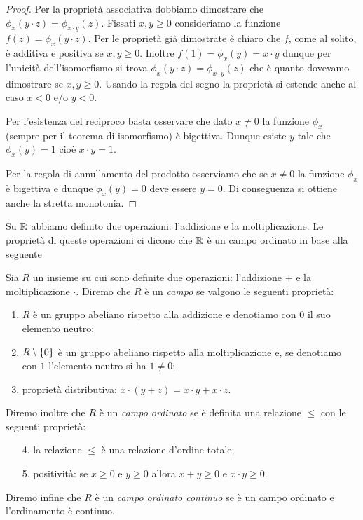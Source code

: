 \begin{proof}
Per la proprietà associativa dobbiamo dimostrare che 
$\phi_x(y\cdot z) = \phi_{x\cdot y}(z)$.
Fissati $x,y\ge 0$ consideriamo 
la funzione $f(z) = \phi_x(y\cdot z)$.
Per le proprietà già dimostrate è chiaro 
che $f$, come al solito, è additiva e positiva
se $x,y\ge 0$.
Inoltre $f(1) = \phi_x(y) = x\cdot y$ 
dunque per l'unicità dell'isomorfismo si 
trova $\phi_x(y\cdot z) = \phi_{x\cdot y}(z)$
che è quanto dovevamo dimostrare se $x,y\ge 0$.
Usando la regola del segno la proprietà si estende 
anche al caso $x<0$ e/o $y<0$.

Per l'esistenza del reciproco basta osservare 
che dato $x\neq 0$ la funzione $\phi_x$ 
(sempre per il teorema di isomorfismo) è 
bigettiva. Dunque esiste $y$ tale che $\phi_x(y)=1$
cioè $x\cdot y = 1$.

Per la regola di annullamento del prodotto osserviamo che 
se $x\neq 0$ la funzione $\phi_x$ è bigettiva 
e dunque $\phi_x(y)=0$ deve essere $y=0$.
Di conseguenza si ottiene anche la stretta monotonia.
\end{proof}

Su ${\mathbb R}$ abbiamo definito due operazioni: l'addizione e la moltiplicazione.
Le proprietà di queste operazioni ci dicono che ${\mathbb R}$ 
è un campo ordinato in base alla seguente

\begin{definition}[campo]
Sia $R$ un insieme su cui sono definite due operazioni: l'addizione $+$ e la moltiplicazione $\cdot$.
Diremo che $R$ è un \emph{campo}
se valgono le seguenti proprietà:
\begin{enumerate}
  \item $R$ è un gruppo abeliano rispetto alla addizione e denotiamo con $0$ il suo elemento neutro;
  \item $R\setminus{\left\{ 0 \right\}}$ è un gruppo abeliano rispetto alla moltiplicazione e,
  se denotiamo con $1$ l'elemento neutro si ha $1\neq 0$;
  \item proprietà distributiva: $x\cdot(y+z) = x\cdot y + x\cdot z$.
\end{enumerate}

Diremo inoltre che $R$ 
è un \emph{campo ordinato}
se è definita una relazione $\le$ 
con le seguenti proprietà:
\begin{enumerate}
  \item[4.] la relazione $\le$ è una relazione d'ordine totale;
  \item[5.] positività: 
  se $x\ge 0$ e $y\ge 0$ allora $x+y\ge 0$ e $x\cdot y \ge 0$.  
\end{enumerate} 

Diremo infine che $R$ è un \emph{campo ordinato continuo} se è un campo ordinato 
e l'ordinamento è continuo.
\end{definition}

